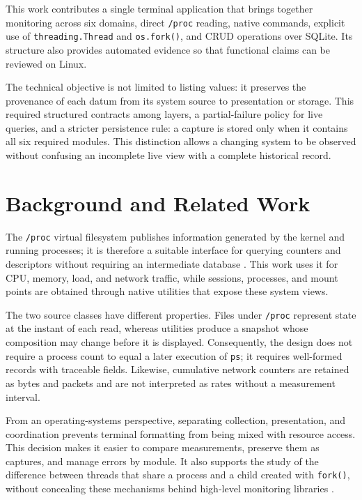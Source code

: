 \documentclass[conference]{IEEEtran}
\begin{document}
This work contributes a single terminal application that brings together monitoring across six domains, direct \texttt{/proc} reading, native commands, explicit use of \texttt{threading.Thread} and \texttt{os.fork()}, and CRUD operations over SQLite. Its structure also provides automated evidence so that functional claims can be reviewed on Linux.

The technical objective is not limited to listing values: it preserves the provenance of each datum from its system source to presentation or storage. This required structured contracts among layers, a partial-failure policy for live queries, and a stricter persistence rule: a capture is stored only when it contains all six required modules. This distinction allows a changing system to be observed without confusing an incomplete live view with a complete historical record.

\section{Background and Related Work}
The \texttt{/proc} virtual filesystem publishes information generated by the kernel and running processes; it is therefore a suitable interface for querying counters and descriptors without requiring an intermediate database \cite{linuxproc}. This work uses it for CPU, memory, load, and network traffic, while sessions, processes, and mount points are obtained through native utilities that expose these system views.

The two source classes have different properties. Files under \texttt{/proc} represent state at the instant of each read, whereas utilities produce a snapshot whose composition may change before it is displayed. Consequently, the design does not require a process count to equal a later execution of \texttt{ps}; it requires well-formed records with traceable fields. Likewise, cumulative network counters are retained as bytes and packets and are not interpreted as rates without a measurement interval.

From an operating-systems perspective, separating collection, presentation, and coordination prevents terminal formatting from being mixed with resource access. This decision makes it easier to compare measurements, preserve them as captures, and manage errors by module. It also supports the study of the difference between threads that share a process and a child created with \texttt{fork()}, without concealing these mechanisms behind high-level monitoring libraries \cite{silberschatz2019}.
\end{document}
